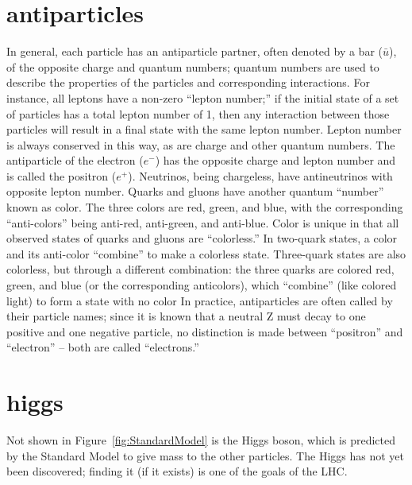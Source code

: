 \section{antiparticles}
In general, each particle has an antiparticle partner, 
often denoted by a bar ($\bar{u}$), 
of the opposite charge and quantum numbers; %
quantum numbers are used to describe the properties of the particles 
and corresponding interactions.  
For instance, all leptons have a non-zero ``lepton number;'' 
if the initial state of a set of particles 
has a total lepton number of 1, 
then any interaction between those particles will 
result in a final state with the same lepton number.  
Lepton number is always conserved in this way, 
as are charge and other quantum numbers.  
The antiparticle of the electron ($e^-$) 
has the opposite charge and lepton number 
and is called the positron ($e^+$).  
Neutrinos, being chargeless, 
have antineutrinos with opposite lepton number.  
Quarks and gluons have another quantum ``number'' known as color.   
The three colors are red, green, and blue, with the corresponding 
``anti-colors'' being anti-red, anti-green, and anti-blue.  
Color is unique in that all observed states of quarks and gluons 
are ``colorless.''
In two-quark states, a color and its anti-color ``combine'' to make a colorless state.  
Three-quark states are also colorless, but through a different combination: 
the three quarks are colored red, green, and blue 
(or the corresponding anticolors), which ``combine'' (like colored light) to form 
a state with no color
In practice, antiparticles are often called by their particle names; 
since it is known that a neutral Z must decay to one positive and one negative 
particle, no distinction is made between ``positron'' and ``electron'' -- 
both are called ``electrons.''  

\section{higgs}  
Not shown in Figure~\ref{fig:StandardModel} is the Higgs boson, 
which is predicted by the Standard Model 
to give mass to the other particles.  
The Higgs has not yet been discovered; 
finding it (if it exists) is one of the 
goals of the LHC.  

